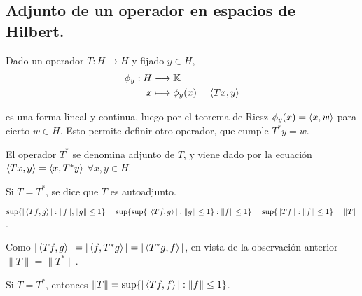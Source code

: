 \subsection{Adjunto de un operador en espacios de Hilbert.}

\begin{remark}
  Dado un operador $T:H\to H$ y fijado $y\in H$,
  \begin{align*}
    \phi_y: H &\longrightarrow \mathbb{K} \\
    x &\longmapsto \phi_y(x) = \left\langle Tx,y\right\rangle
  \end{align*}

  es una forma lineal y continua, luego por el teorema de Riesz
  $\phi_y(x)=\left\langle x,w\right\rangle$ para cierto $w\in H$. Esto permite definir otro
  operador, que cumple $T^*y=w$.
\end{remark}

\begin{definition}
  El operador $T^*$ se denomina adjunto de $T$, y viene dado por la ecuación
  $\left\langle Tx,y\right\rangle=\left\langle x,T^*y\right\rangle$ $\forall x,y\in H$.
\end{definition}

\begin{definition}
  Si $T=T^*$, se dice que $T$ es autoadjunto.
\end{definition}

\begin{remark} \label{rem:norm-alternative}
  $\sup \{|\left\langle Tf,g\right\rangle| : \|f\|,\|g\|\le 1\}=
  \sup \{\sup \{|\left\langle Tf,g\right\rangle| : \|g\|\le 1 \} : \|f\|\le 1\}=
  \sup \{\|Tf\|:\|f\|\le 1\} =\|T\|$.
\end{remark}

\begin{remark}
  Como $|\left\langle Tf,g\right\rangle|=|\left\langle f,T^*g\right\rangle|=|\left\langle T^*g,f\right\rangle|$, en vista de la
  observación anterior $\|T\|=\|T^*\|$.
\end{remark}

\begin{proposition}
  Si $T=T^*$, entonces $\|T\|=\sup \{|\left\langle Tf,f\right\rangle|:\|f\|\le 1\} $.
\end{proposition}

